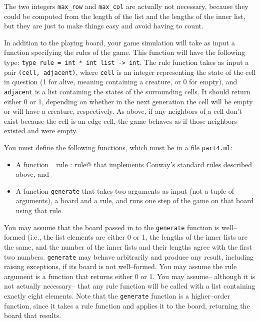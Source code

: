 \documentclass[11pt]{article}
\begin{document}
    The two integers \texttt{max\_row} and \texttt{max\_col} are actually not
  necessary, because they could be computed from the length of the list and
  the lengths of the inner list, but they are just to make things easy and
  avoid having to count.

    In addition to the playing board, your game simulation will take as input
  a function specifying the rules of the game.  This function will have the
  following type: \texttt{type rule = int * int list -> int}.  The rule
  function takes as input a pair \texttt{(cell, adjacent)}, where
  \texttt{cell} is an integer representing the state of the cell in question
  (1 for alive, meaning containing a creature, or 0 for empty), and
  \texttt{adjacent} is a list containing the states of the surrounding
  cells.
  It should return either 0 or 1, depending on whether in the next
  generation the cell will be empty or will have a creature, respectively.
  As above, if any neighbors of a cell don't exist because the cell is an
  edge cell, the game behaves as if those neighbors existed and were empty.

    You must define the following functions, which must be in a file
  \texttt{part4.ml}:

    \vspace{-2.5mm}

    \begin{itemize}

      \addtolength{\itemsep}{-1.25mm}

      \item A function \verb@standard_rule : rule@ that implements Conway's
            standard rules described above, and

      \item A function \texttt{generate} that takes two arguments as input
            (not a tuple of arguments), a board and a rule, and runs one
            step of the game on that board using that rule.

     \end{itemize}

    \vspace{-2.5mm}

    You may assume that the board passed in to the \texttt{generate} function
  is well--formed (i.e., the list elements are either 0 or 1, the lengths of
  the inner lists are the same, and the number of the inner lists and their
  lengths agree with the first two numbers.  \texttt{generate} may behave
  arbitrarily and produce any result, including raising exceptions, if its
  board is not well--formed.  You may assume the rule argument is a function
  that returns either 0 or 1.  You may assume-- although it is not actually
  necessary-- that any rule function will be called with a list containing
  exactly eight elements.  Note that the \texttt{generate} function is a
  higher--order function, since it takes a rule function and applies it to
  the board, returning the board that results.
\end{document}
